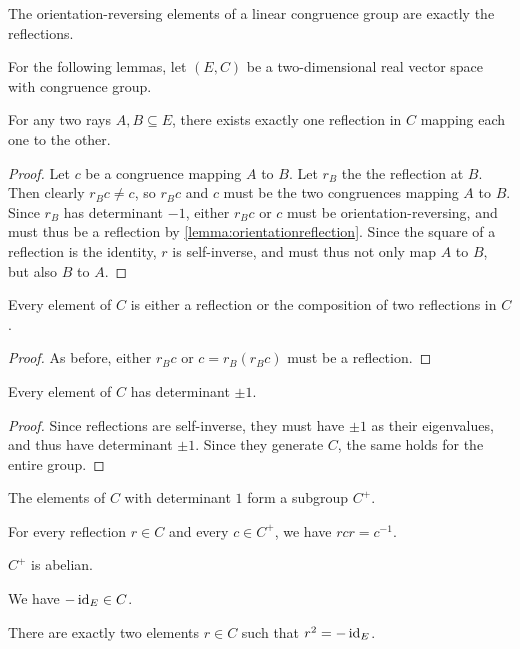 \begin{lemma}
	\label{lemma:orientationreflection}
	The orientation-reversing elements of a linear congruence group are exactly the reflections.
\end{lemma}
For the following lemmas, let $(E,C)$ be a two-dimensional real vector space with congruence group.
\begin{lemma}
	For any two rays $A,B \subseteq E$, there exists exactly one reflection in $C$ mapping each one to the other.
\end{lemma}
\begin{proof}
	Let $c$ be a congruence mapping $A$ to $B$. Let $r_B$ the the reflection at $B$. Then clearly $r_Bc \neq c$, so $r_Bc$ and $c$ must be the two congruences mapping $A$ to $B$. Since $r_B$ has determinant $-1$, either $r_Bc$ or $c$ must be orientation-reversing, and must thus be a reflection by \ref{lemma:orientationreflection}. Since the square of a reflection is the identity, $r$ is self-inverse, and must thus not only map $A$ to $B$, but also $B$ to $A$.
\end{proof}
\begin{lemma}
	Every element of $C$ is either a reflection or the composition of two reflections in $C$.
\end{lemma}
\begin{proof}
	As before, either $r_Bc$ or $c = r_B(r_Bc)$ must be a reflection.
\end{proof}
\begin{lemma}
	Every element of $C$ has determinant $\pm 1$.
\end{lemma}
\begin{proof}
	Since reflections are self-inverse, they must have $\pm 1$ as their eigenvalues, and thus have determinant $\pm 1$. Since they generate $C$, the same holds for the entire group.
\end{proof}
\begin{lemma}
	The elements of $C$ with determinant $1$ form a subgroup $C^+$.
\end{lemma}
\begin{lemma}
	For every reflection $r \in C$ and every $c \in C^+$, we have $rcr = c^{-1}$.
\end{lemma}
\begin{lemma}
	$C^+$ is abelian.
\end{lemma}
\begin{lemma}
	We have $-\operatorname{id}_E \in C$.
\end{lemma}
\begin{lemma}
	There are exactly two elements $r \in C$ such that $r^2 = -\operatorname{id}_E$.
\end{lemma}
\fi

